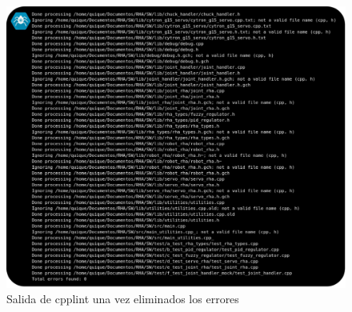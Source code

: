         \begin{figure}[H]
        	\centering
        	\includegraphics[width=1\textwidth]{figuras/Imagenes_SW/test/ReadibilityTest_3.jpg}
        	\caption{Salida de cpplint una vez eliminados los errores}
        	\label{fig:SW:test:cpplint_ok}
        \end{figure}
